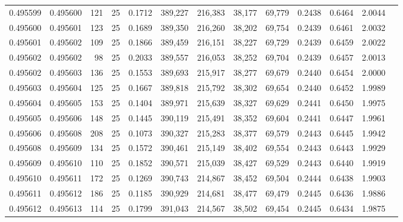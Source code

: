\begin{tabular}{rrrrrrrrrrrrr}
0.495599 & 0.495600 &   121 &  25 &                                     0.1712 & 389,227 & 216,383 &  38,177 &  69,779 & 0.2438 & 0.6464 & 2.0044 \\
0.495600 & 0.495601 &   123 &  25 &                                     0.1689 & 389,350 & 216,260 &  38,202 &  69,754 & 0.2439 & 0.6461 & 2.0032 \\
0.495601 & 0.495602 &   109 &  25 &                                     0.1866 & 389,459 & 216,151 &  38,227 &  69,729 & 0.2439 & 0.6459 & 2.0022 \\
0.495602 & 0.495602 &    98 &  25 &                                     0.2033 & 389,557 & 216,053 &  38,252 &  69,704 & 0.2439 & 0.6457 & 2.0013 \\
0.495602 & 0.495603 &   136 &  25 &                                     0.1553 & 389,693 & 215,917 &  38,277 &  69,679 & 0.2440 & 0.6454 & 2.0000 \\
0.495603 & 0.495604 &   125 &  25 &                                     0.1667 & 389,818 & 215,792 &  38,302 &  69,654 & 0.2440 & 0.6452 & 1.9989 \\
0.495604 & 0.495605 &   153 &  25 &                                     0.1404 & 389,971 & 215,639 &  38,327 &  69,629 & 0.2441 & 0.6450 & 1.9975 \\
0.495605 & 0.495606 &   148 &  25 &                                     0.1445 & 390,119 & 215,491 &  38,352 &  69,604 & 0.2441 & 0.6447 & 1.9961 \\
0.495606 & 0.495608 &   208 &  25 &                                     0.1073 & 390,327 & 215,283 &  38,377 &  69,579 & 0.2443 & 0.6445 & 1.9942 \\
0.495608 & 0.495609 &   134 &  25 &                                     0.1572 & 390,461 & 215,149 &  38,402 &  69,554 & 0.2443 & 0.6443 & 1.9929 \\
0.495609 & 0.495610 &   110 &  25 &                                     0.1852 & 390,571 & 215,039 &  38,427 &  69,529 & 0.2443 & 0.6440 & 1.9919 \\
0.495610 & 0.495611 &   172 &  25 &                                     0.1269 & 390,743 & 214,867 &  38,452 &  69,504 & 0.2444 & 0.6438 & 1.9903 \\
0.495611 & 0.495612 &   186 &  25 &                                     0.1185 & 390,929 & 214,681 &  38,477 &  69,479 & 0.2445 & 0.6436 & 1.9886 \\
0.495612 & 0.495613 &   114 &  25 &                                     0.1799 & 391,043 & 214,567 &  38,502 &  69,454 & 0.2445 & 0.6434 & 1.9875 \\

\end{tabular}
